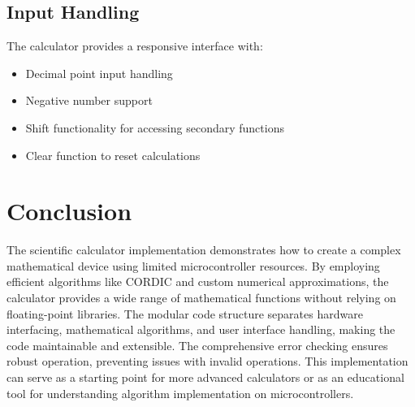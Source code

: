 \documentclass[12pt]{article}
\begin{document}
\subsection{Input Handling}
The calculator provides a responsive interface with:
\begin{itemize}
\item Decimal point input handling
\item Negative number support
\item Shift functionality for accessing secondary functions
\item Clear function to reset calculations
\end{itemize}
\section{Conclusion}
The scientific calculator implementation demonstrates how to create a complex mathematical device using limited microcontroller resources. By employing efficient algorithms like CORDIC and custom numerical approximations, the calculator provides a wide range of mathematical functions without relying on floating-point libraries.
The modular code structure separates hardware interfacing, mathematical algorithms, and user interface handling, making the code maintainable and extensible. The comprehensive error checking ensures robust operation, preventing issues with invalid operations.
This implementation can serve as a starting point for more advanced calculators or as an educational tool for understanding algorithm implementation on microcontrollers.
\end{document}
